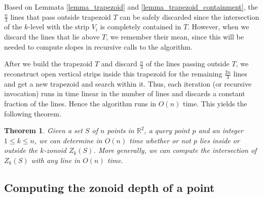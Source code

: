 \documentclass{elsart}
\newtheorem{theorem}{Theorem}
\newcommand{\comment}[1]{}
\begin{document}
Based on Lemmata \ref{lemma_trapezoid} and
\ref{lemma_trapezoid_containment}, the $\frac{n}{3}$ lines that pass
outside trapezoid $T$ can be safely discarded since the intersection
of the $k$-level with the strip $V_i$ is completely contained in $T$.
However, when we discard the lines that lie above $T$, we remember
their mean, since this will be needed to compute slopes in recursive
calls to the algorithm.

\comment{
It may be observed that until recently in our discussion, we were trying to find the vertex on the boundary of the dual of the $k$-zonoid at which line $p_1^*$ becomes a tangent. But above we show that it is the $k$-level that lies completely inside the trapezoid $T$ and the vertex point is being searched for on the $k$-level, not on the boundary of the dual of the $k$-zonoid. This is because, 
\begin{enumerate}
\item we do not explicitly construct the $k$-zonoid in the dual,
\item each vertex on the boundary of the dual of the $k$-zonoid is calculated by taking the mean of the $k$ lines above a $k$-level vertex,
\item even though we disregard lines above and passing outside the trapezoid $T$, their equations can be associated with each $k$-level vertex and the corresponding $k$-zonoid dual vertex be computed, as need arises.  
\end{enumerate}
}

After we build the trapezoid $T$ and discard $\frac{n}{3}$ of the
lines passing outside $T$, we reconstruct open vertical strips inside
this trapezoid for the remaining $\frac{2n}{3}$ lines and get a new
trapezoid and search within it. Thus, each iteration (or recursive
invocation) runs in time linear in the number of lines and discards a
constant fraction of the lines. Hence the algorithm runs in $O(n)$
time. This yields the following theorem.

\begin{theorem}\label{theorem_decision_problem}
Given a set $S$ of $n$ points in $\mathbb{R}^2$, a query point $p$ and
an integer $1 \le k \le n$, we can determine in $O(n)$ time whether or not $p$ lies inside or outside the $k$-zonoid $Z_k(S)$. More generally, we can compute the intersection of $Z_k(S)$ with any line in $O(n)$ time.
\end{theorem}

\subsection{Computing the zonoid depth of a point}
\label{subsection_computing_the_zonoid_depth_of_a_point}
\end{document}
